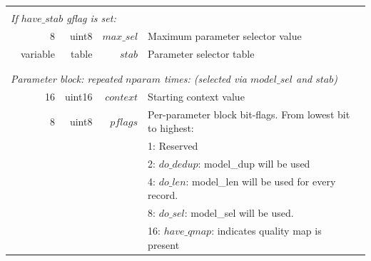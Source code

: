 \documentclass[a4paper]{article}
\begin{document}
\begin{table}
\begin{tabular}{|r|r|r|r|r|p{8cm}|l|l|}
\multicolumn{8}{|l|}{}\\[-0.5em]
\multicolumn{8}{|l|}{\textit{If $have\_stab$ gflag is set:} }                                                                                                                                 \\
\cline{2-7}
                       & \multicolumn{2}{r|}{8}        & uint8          & $max\_sel$                     & \multicolumn{2}{p{8.4cm}|}{Maximum parameter selector value} & \\
                       & \multicolumn{2}{r|}{variable} & table          & $stab$                         & \multicolumn{2}{p{8.4cm}|}{Parameter selector table} & \\
\cline{2-7}
\multicolumn{8}{|l|}{}\\
\hline
\hline
\multicolumn{8}{|l|}{}\\[-0.7em]
\multicolumn{8}{|l|}{\textit{Parameter block: repeated $nparam$ times: (selected via $model\_sel$ and $stab$)}} \\
\cline{2-7}
                       & \multicolumn{2}{r|}{16}        & uint16        & $context$                      & \multicolumn{2}{p{8.4cm}|}{Starting context value} & \\
\cline{2-7}
                       & \multicolumn{2}{r|}{8}        & uint8          & $pflags$                       & \multicolumn{2}{p{8.4cm}|}{Per-parameter block bit-flags. From lowest bit to highest:} & \\
                       & \multicolumn{2}{r|}{}         &                &                                & \multicolumn{2}{p{8.4cm}|}{1: Reserved} & \\
                       & \multicolumn{2}{r|}{}         &                &                                & \multicolumn{2}{p{8.4cm}|}{2: $do\_dedup$: model\_dup will be used} & \\
                       & \multicolumn{2}{r|}{}         &                &                                & \multicolumn{2}{p{8.4cm}|}{4: $do\_len$: model\_len will be used for every record.} & \\
                       & \multicolumn{2}{r|}{}         &                &                                & \multicolumn{2}{p{8.4cm}|}{8: $do\_sel$: model\_sel will be used.} & \\
                       & \multicolumn{2}{r|}{}         &                &                                & \multicolumn{2}{p{8.4cm}|}{16: $have\_qmap$: indicates quality map is present} & \\

\end{tabular}
\end{table}
\end{document}
